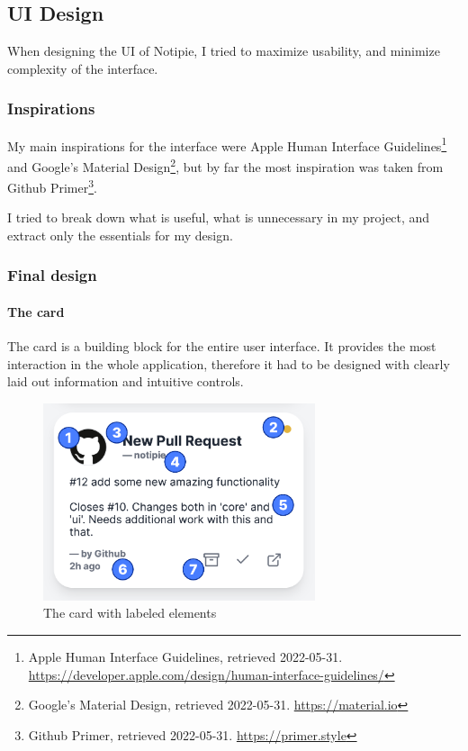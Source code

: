 \subsection{UI Design}\label{ui-design}

When designing the UI of Notipie, I tried to maximize usability, and
minimize complexity of the interface.

\subsubsection{Inspirations}\label{inspirations}

My main inspirations for the interface were Apple Human Interface
Guidelines\footnote{Apple Human Interface Guidelines, retrieved
2022-05-31.
\url{https://developer.apple.com/design/human-interface-guidelines/}}
and Google's Material Design\footnote{Google's Material Design,
retrieved 2022-05-31. \url{https://material.io}}, but by far the most
inspiration was taken from Github Primer\footnote{Github Primer,
retrieved 2022-05-31. \url{https://primer.style}}.

I tried to break down what is useful, what is unnecessary in my project,
and extract only the essentials for my design.

\subsubsection{Final design}\label{final-design}

\paragraph{The card}\label{the-card}

The card is a building block for the entire user interface. It provides
the most interaction in the whole application, therefore it had to be
designed with clearly laid out information and intuitive controls.

\begin{figure}
  \centering
  \includegraphics[width=8cm,keepaspectratio]{./img/card_labeled.png}
  \caption{The card with labeled elements}
\end{figure}

